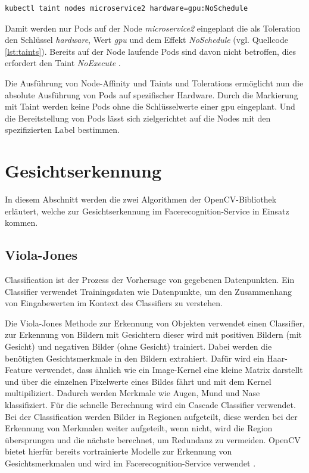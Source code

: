 \begin{lstlisting}[caption={Node-Taints},captionpos=b,label={lst:taints},language=bash]
kubectl taint nodes microservice2 hardware=gpu:NoSchedule
\end{lstlisting}

Damit werden nur Pods auf der Node \textit{microservice2} eingeplant die als Toleration den Schlüssel \textit{hardware}, Wert \textit{gpu} und dem Effekt \textit{NoSchedule} (vgl. Quellcode \ref{lst:taints}).
Bereits auf der Node laufende Pods sind davon nicht betroffen, dies erfordert den Taint \textit{NoExecute} \cite{taintstolerations}.

Die Ausführung von Node-Affinity und Taints und Tolerations ermöglicht nun die absolute Ausführung von Pods auf spezifischer Hardware.
Durch die Markierung mit Taint werden keine Pods ohne die Schlüsselwerte einer \acs{gpu} eingeplant.
Und die Bereitstellung von Pods lässt sich zielgerichtet auf die Nodes mit den spezifizierten Label bestimmen.

\section{Gesichtserkennung}
In diesem Abschnitt werden die zwei Algorithmen der OpenCV-Bibliothek erläutert, welche zur Gesichtserkennung im Facerecognition-Service in Einsatz kommen.

\subsection{Viola-Jones}

Classification ist der Prozess der Vorhersage von gegebenen Datenpunkten.
Ein Classifier verwendet Trainingsdaten wie Datenpunkte, um den Zusammenhang von Eingabewerten im Kontext des Classifiers zu verstehen.

Die Viola-Jones Methode zur Erkennung von Objekten verwendet einen Classifier,
zur Erkennung von Bildern mit Gesichtern dieser wird mit positiven Bildern (mit Gesicht) und negativen Bilder (ohne Gesicht) trainiert.
Dabei werden die benötigten Gesichtsmerkmale in den Bildern extrahiert.
Dafür wird ein Haar-Feature verwendet, dass ähnlich wie ein Image-Kernel eine kleine Matrix darstellt und über die einzelnen Pixelwerte eines Bildes fährt und mit dem Kernel multipiliziert.
Dadurch werden Merkmale wie Augen, Mund und Nase klassifiziert.
Für die schnelle Berechnung wird ein Cascade Classifier verwendet. 
Bei der Classification werden Bilder in Regionen aufgeteilt, diese werden bei der Erkennung von Merkmalen weiter aufgeteilt, wenn nicht, wird die Region übersprungen und die nächste berechnet, um Redundanz zu vermeiden.
OpenCV bietet hierfür bereits vortrainierte Modelle zur Erkennung von Gesichtsmerkmalen und wird im Facerecognition-Service verwendet \cite{opencvcascade}.


